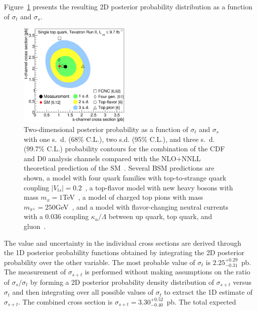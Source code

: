 \documentclass[aps,prl,twocolumn,showpacs,superscriptaddress,groupedaddress]{revtex4}  %
\begin{document}
Figure~\ref{fig:tevposterior} presents the resulting 2D posterior
probability distribution as a function of $\sigma_t$ and $\sigma_s$.
%
\begin{figure}[!h!tbp]
\begin{center}
\includegraphics[width=0.48\textwidth]{fig02.eps}
\caption{Two-dimensional posterior probability as a function of
  $\sigma_t$ and $\sigma_s$ with one s.\ d. (68\% C.L.), two
  s.d. (95\% C.L.), and three s.\ d. (99.7\% C.L.) probability
  contours for the combination of the CDF and D0 analysis channels
  compared with the NLO+NNLL theoretical prediction of the
  SM~\cite{schannel-kidonakis,tchannel-kidonakis}. Several BSM
  predictions are shown, a model with four quark families with
  top-to-strange quark coupling $|V_{ts}| = 0.2$~\cite{FourthGen2}, a
  top-flavor model with new heavy bosons with mass $m_x = 
  1$\;TeV~\cite{Tait:2000sh}, a model of charged top pions with mass
  $m_{\pi^{\pm}} = 250$\;GeV~\cite{Tait:2000sh}, and a model with
  flavor-changing neutral currents with a 0.036 coupling
  $\kappa_u/\Lambda$ between up quark, top quark, and
  gluon~\cite{Tait:2000sh,d0-fcnc}.}
\label{fig:tevposterior}
\end{center}
\end{figure}
%
The value and uncertainty in the individual cross sections are derived
through the 1D posterior probability functions obtained by integrating
the 2D posterior probability over the other variable. The most
probable value of $\sigma_t$ is $2.25 ^{+0.29}_{-0.31}$~pb. The
measurement of $\sigma_{s+t}$ is performed without making assumptions
on the ratio of $\sigma_s/\sigma_t$ by forming a 2D posterior
probability density distribution of $\sigma_{s+t}$ versus $\sigma_t$
and then integrating over all possible values of $\sigma_t$ to extract
the 1D estimate of $\sigma_{s+t}$. The combined cross section is
$\sigma_{s+t} = 3.30^{+0.52}_{-0.40}$~pb. The total expected
\end{document}
